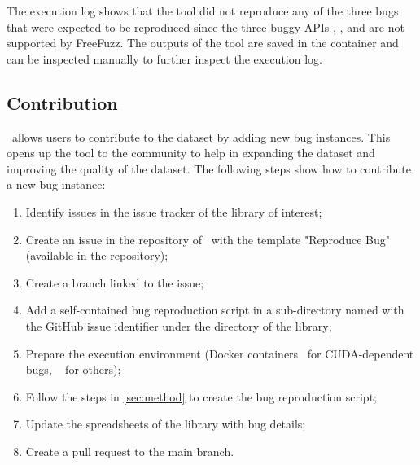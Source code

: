 \documentclass[sigconf,screen]{acmart}
\begin{document}
The execution log shows that the tool did not reproduce any of the
three bugs that were expected to be reproduced since the three buggy APIs , , and  are not supported by FreeFuzz. The outputs of the tool are saved in the container and can be inspected manually to further inspect the execution log.

\subsection{Contribution}

\tname\ allows users to contribute to the dataset by adding new bug
instances. This opens up the tool to the community to help in
expanding the dataset and improving the quality of the dataset.
The following steps show how to contribute a new bug
instance:

\begin{enumerate}[leftmargin=0.5cm]
  \item Identify issues in the issue tracker of the library of interest;
  \item Create an issue in the repository of \tname\ with the template
    "Reproduce Bug" (available in the repository);
  \item Create a branch linked to the issue;
  \item Add a self-contained bug reproduction script in a sub-directory
    named with the GitHub issue identifier under the directory of the library;
  \item Prepare the execution environment (Docker containers~\cite{merkel2014docker} for CUDA-dependent
    bugs, ~\cite{venv} for others);
  \item Follow the steps in \ref{sec:method} to create the bug reproduction script;
  \item Update the spreadsheets of the library with bug details;
  \item Create a pull request to the main branch.
\end{enumerate}

\end{document}
